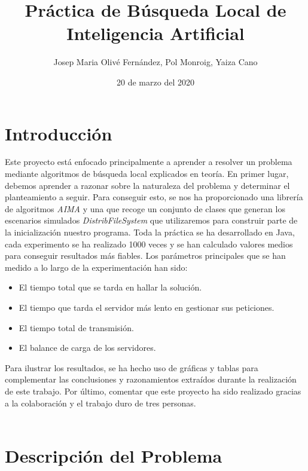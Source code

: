 \documentclass[a4paper,10pt]{report}
\title{Práctica de Búsqueda Local de Inteligencia Artificial}
\author{Josep Maria Olivé Fernández,
        Pol Monroig,
        Yaiza Cano}
\date{20 de marzo del 2020}
\begin{document}
	\maketitle
	
	\section*{Introducción}

    Este proyecto está enfocado principalmente a aprender a resolver un problema mediante algoritmos de búsqueda local explicados en teoría.\newline
    En primer lugar, debemos aprender a razonar sobre la naturaleza del problema y determinar el planteamiento a seguir. Para conseguir esto, se nos ha proporcionado una librería de algoritmos \textit{AIMA} y una que recoge un conjunto de clases que generan los escenarios simulados \textit{DistribFileSystem} que utilizaremos para construir parte de la inicialización nuestro programa.\newline\newline
    Toda la práctica se ha desarrollado en Java, cada experimento se ha realizado 1000 veces y se han calculado valores medios para conseguir resultados más fiables. Los parámetros principales que se han medido a lo largo de la experimentación han sido:
    \begin{itemize}
        \item El tiempo total que se tarda en hallar la solución.
        \item El tiempo que tarda el servidor más lento en gestionar sus peticiones.
        \item El tiempo total de transmisión.
        \item El balance de carga de los servidores.
    \end{itemize}
    Para ilustrar los resultados, se ha hecho uso de gráficas y tablas para complementar las conclusiones y razonamientos extraídos durante la realización de este trabajo.\newline\newline
    Por último, comentar que este proyecto ha sido realizado gracias a la colaboración y el trabajo duro de tres personas.\\\\
    
    \newpage
    \section*{Descripción del Problema}
    
\end{document}

